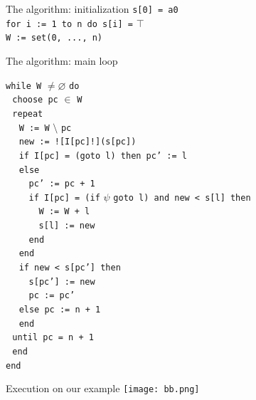\documentclass{beamer}
\begin{document}
\begin{frame}{The algorithm: initialization}
\smallskip
{\tt s[0] = a0} \\
{\tt for i := 1 to n do s[i] =} $\top$ \\
{\tt W := set(0, ..., n)}
\end{frame}

\begin{frame}{The algorithm: main loop}
\smallskip
\begin{footnotesize}
{\tt while W} $\neq \varnothing$ {\tt do} \\
$\, \,$ {\tt choose pc} $\in$ {\tt W} \\
$\, \,$ {\tt repeat} \\
$\, \, \, \, \, \,$ {\tt W := W} $\setminus$ {\tt pc} \\
$\, \, \, \, \, \,$ {\tt new := ![I[pc]!](s[pc])} \\
$\, \, \, \, \, \,$ {\tt if I[pc] = (goto l) then pc' := l} \\
$\, \, \, \, \, \,$ {\tt else} \\
$\, \, \, \, \, \, \, \, \, \, \, \,$ {\tt pc' := pc + 1} \\
$\, \, \, \, \, \, \, \, \, \, \, \,$ {\tt if I[pc] = (if} $\psi$ {\tt goto l) and new < s[l] then} \\
$\, \, \, \, \, \, \, \, \, \, \, \, \, \, \, \, \, \,$ {\tt W := W + l} \\
$\, \, \, \, \, \, \, \, \, \, \, \, \, \, \, \, \, \,$ {\tt s[l] := new} \\
$\, \, \, \, \, \, \, \, \, \, \, \,$ {\tt end} \\
$\, \, \, \, \, \,$ {\tt end} \\
$\, \, \, \, \, \,$ {\tt if new < s[pc'] then} \\
$\, \, \, \, \, \, \, \, \, \, \, \,$ {\tt s[pc'] := new} \\
$\, \, \, \, \, \, \, \, \, \, \, \,$ {\tt pc := pc'} \\
$\, \, \, \, \, \,$ {\tt else pc := n + 1} \\
$\, \, \, \, \, \,$ {\tt end} \\
$\, \,$ {\tt until pc = n + 1} \\
$\, \,$ {\tt end} \\
{\tt end} \\
\end{footnotesize}
\end{frame}

\begin{frame}{Execution on our example}
\texttt{[image: bb.png]}
\end{frame}
\end{document}

